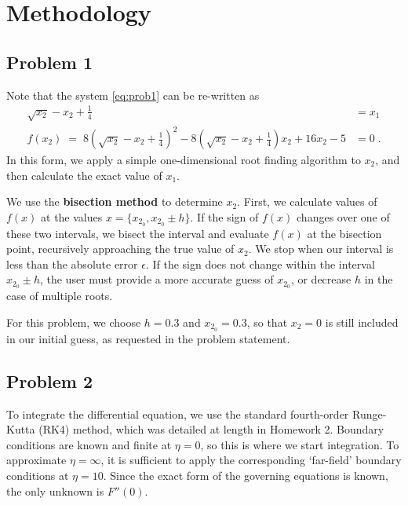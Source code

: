 \documentclass[12pt]{article}
\begin{document}
\section{Methodology} %

\subsection{Problem 1}

Note that the system \eqref{eq:prob1} can be re-written as
\begin{equation}
\begin{alignedat}{2}
\sqrt{x_2} - x_2 + \tfrac{1}{4} &= x_1 \\
f(x_2) \; = \; 8 \left( \sqrt{x_2} - x_2 + \tfrac{1}{4} \right)^2 - 8 \left( \sqrt{x_2} - x_2 + \tfrac{1}{4} \right) x_2 + 16 x_2 - 5  &= 0
\;.
\end{alignedat}
\label{eq:prob1rewrite}
\end{equation}
In this form, we apply a simple one-dimensional root finding algorithm to $x_2$, and then calculate the exact value of $x_1$.

We use the \textbf{bisection method} to determine $x_2$. First, we calculate values of $f(x)$ at the values $x = \{ x_{2_0}, x_{2_0} \pm h \}$. If the sign of $f(x)$ changes over one of these two intervals, we bisect the interval and evaluate $f(x)$ at the bisection point, recursively approaching the true value of $x_2$. We stop when our interval is less than the absolute error $\epsilon$. If the sign does not change within the interval $x_{2_0} \pm h$, the user must provide a more accurate guess of $x_{2_0}$, or decrease $h$ in the case of multiple roots.

For this problem, we choose $h=0.3$ and $x_{2_0} = 0.3$, so that $x_2=0$ is still included in our initial guess, as requested in the problem statement.

\subsection{Problem 2}

To integrate the differential equation, we use the standard fourth-order Runge-Kutta (RK4) method, which was detailed at length in Homework 2. Boundary conditions are known and finite at $\eta = 0$, so this is where we start integration. To approximate $\eta = \infty$, it is sufficient to apply the corresponding `far-field' boundary conditions at $\eta = 10$. Since the exact form of the governing equations is known, the only unknown is $F''(0)$.
\end{document}
